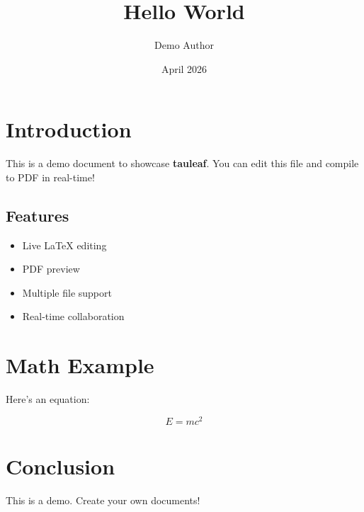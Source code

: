 \documentclass{article}
\title{Hello World}
\author{Demo Author}
\date{April 2026}
\begin{document}
\maketitle

\section{Introduction}

This is a demo document to showcase \textbf{tauleaf}. 
You can edit this file and compile to PDF in real-time!

\subsection{Features}

\begin{itemize}
    \item Live LaTeX editing
    \item PDF preview
    \item Multiple file support
    \item Real-time collaboration
\end{itemize}

\section{Math Example}

Here's an equation:

\begin{equation}
    E = mc^2
\end{equation}

\section{Conclusion}

This is a demo. Create your own documents!
\end{document}
